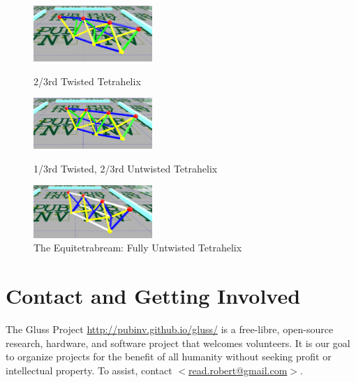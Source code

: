 \documentclass[11pt]{article}
\begin{document}
\begin{figure}[H] %
  \centering
     \includegraphics[width=0.4\textwidth]{figures/Tetrahelix1.png}
     \caption{2/3rd Twisted Tetrahelix}
     \includegraphics[width=0.4\textwidth]{figures/Tetrahelix2.png}
     \caption{1/3rd Twisted, 2/3rd Untwisted Tetrahelix}
     \includegraphics[width=0.4\textwidth]{figures/Tetrahelix3.png}
     \caption{The Equitetrabream: Fully Untwisted Tetrahelix}
\end{figure}

\section{Contact and Getting Involved}

The Gluss Project \url{http://pubinv.github.io/gluss/}
is a free-libre, open-source research, hardware, and software project that welcomes volunteers.
It is our goal to organize projects for the benefit of all humanity without seeking profit or intellectual property.
To assist, contact \href{mailto:read.robert@gmail.com}{$<$read.robert@gmail.com$>$}.



\end{document}

